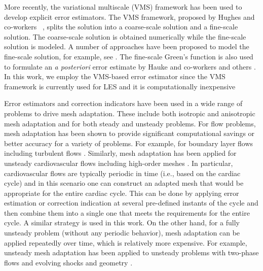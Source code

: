 More recently, the variational multiscale (VMS) framework has been used to develop explicit error estimators. 
The VMS framework, proposed by Hughes and co-workers ~\cite{hughes1995multiscale,hughes1998variational}, splits the solution into a coarse-scale solution and a fine-scale solution. 
The coarse-scale solution is obtained numerically while the fine-scale solution is modeled. 
A number of approaches have been proposed to model the fine-scale solution, for example, see \cite{brezzi1997b,brezzi1992relationship,brezzi1994choosing,codina2002stabilized,hughes2007variational,principe2010stabilization}. 
The fine-scale Green's function is also used to formulate an \textit{a posteriori} error estimate by Hauke and co-workers \cite{hauke2006proper,hauke2006multiscale,hauke2008variational,hauke2012mesh,hauke2014recent,hauke2015variational,irisarri2016posteriori} and others \cite{bayona2018variational}.
In this work, we employ the VMS-based error estimator
since the VMS framework is currently used for LES and it is computationally inexpensive

Error estimators and correction indicators have been used in a wide range of problems to drive mesh adaptation. These include both isotropic and anisotropic mesh adaptation and for both steady and unsteady problems. For flow problems, mesh adaptation has been shown to provide significant computational savings or better accuracy for a variety of problems. For example, for boundary layer flows \cite{bib:Sahni2008,bib:Sahni2017_adapt} including turbulent flows \cite{bib:Chitale2015}. Similarly, mesh adaptation has been applied for unsteady cardiovascular flows \cite{bib:Muller2005,bib:Sahni2006,bib:Sahni2009} including high-order meshes \cite{bib:Sahni2010}. In particular, cardiovascular flows are typically periodic in time (i.e., based on the cardiac cycle) and in this scenario one can construct an adapted mesh that would be appropriate for the entire cardiac cycle. This can be done by applying error estimation or correction indication at several pre-defined instants of the cycle and then combine them into a single one that meets the requirements for the entire cycle. A similar strategy is used in this work. On the other hand, for a fully unsteady problem (without any periodic behavior), mesh adaptation can be applied repeatedly over time, which is relatively more expensive. For example, unsteady mesh adaptation has been applied to unsteady problems with two-phase flows \cite{bib:rodriguez2013} and evolving shocks and geometry \cite{bib:Yang2021}.


